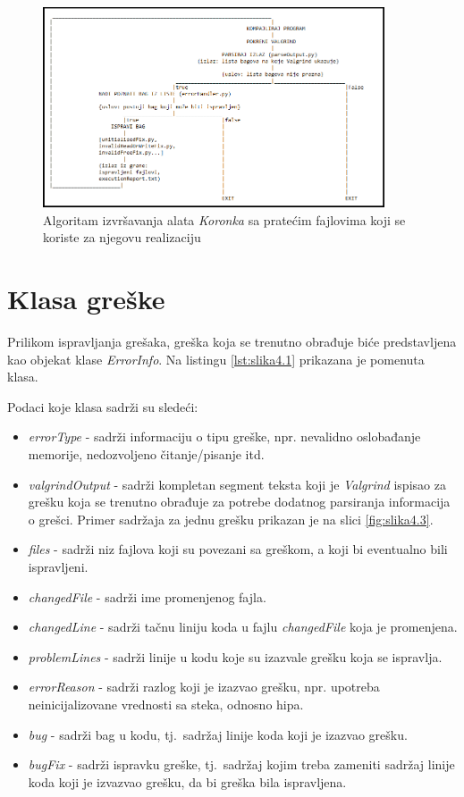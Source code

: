 \documentclass[12pt,oneside]{memoir}
\theoremstyle{plain}
\theoremstyle{definition}
\begin{document}
\begin{figure}[!ht]
  \centering
  \includegraphics[width=0.9\textwidth]{ExecutingAlgorithm.png}
  \caption{Algoritam izvršavanja alata \textit{Koronka} sa pratećim fajlovima koji se koriste za njegovu realizaciju}
  \label{fig:slika4.4}
\end{figure}

\section{Klasa greške}
Prilikom ispravljanja grešaka, greška koja se trenutno obrađuje biće predstavljena kao objekat klase \textit{ErrorInfo}. Na listingu \ref{lst:slika4.1} prikazana je pomenuta klasa.

Podaci koje klasa sadrži su sledeći:
\begin{itemize}
\item \textit{errorType} - sadrži informaciju o tipu greške, npr. nevalidno oslobađanje memorije, nedozvoljeno čitanje/pisanje itd.
\item \textit{valgrindOutput} - sadrži kompletan segment teksta koji je \textit{Valgrind} ispisao za grešku koja se trenutno obrađuje za potrebe dodatnog parsiranja informacija o grešci. Primer sadržaja za jednu grešku prikazan je na slici \ref{fig:slika4.3}.
\item \textit{files} - sadrži niz fajlova koji su povezani sa greškom, a koji bi eventualno bili ispravljeni.
\item \textit{changedFile} - sadrži ime promenjenog fajla.
\item \textit{changedLine} - sadrži tačnu liniju koda u fajlu \textit{changedFile} koja je promenjena.
\item \textit{problemLines} - sadrži linije u kodu koje su izazvale grešku koja se ispravlja.
\item \textit{errorReason} - sadrži razlog koji je izazvao grešku, npr. upotreba neinicijalizovane vrednosti sa steka, odnosno hipa.
\item \textit{bug} - sadrži bag u kodu, tj.~sadržaj linije koda koji je izazvao grešku.
\item \textit{bugFix} - sadrži ispravku greške, tj.~sadržaj kojim treba zameniti sadržaj linije koda koji je izvazvao grešku, da bi greška bila ispravljena.
\end{itemize}
\end{document}
